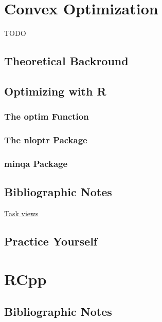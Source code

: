 \documentclass[]{book}
\theoremstyle{definition}
\theoremstyle{definition}
\theoremstyle{definition}
\theoremstyle{remark}
\begin{document}
\chapter{Convex Optimization}\label{convex}

TODO

\section{Theoretical Backround}\label{theoretical-backround}

\section{Optimizing with R}\label{optimizing-with-r}

\subsection{The optim Function}\label{the-optim-function}

\subsection{The nloptr Package}\label{the-nloptr-package}

\subsection{minqa Package}\label{minqa-package}

\section{Bibliographic Notes}\label{bibliographic-notes-14}

\href{https://cran.r-project.org/web/views/Optimization.html}{Task
views}

\section{Practice Yourself}\label{practice-yourself-15}

\chapter{RCpp}\label{rcpp}

\section{Bibliographic Notes}\label{bibliographic-notes-15}
\end{document}
